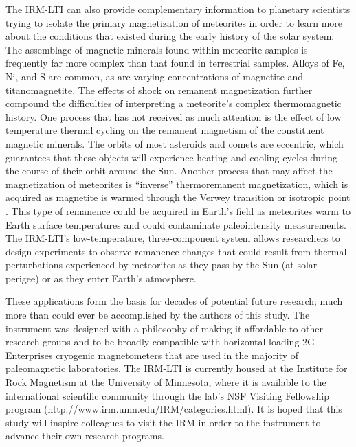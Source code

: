 \documentclass[draft,gc]{AGUTeX}
\begin{document}
\begin{article}
The IRM-LTI can also provide complementary information to planetary scientists trying to isolate the primary magnetization of meteorites in order to learn more about the conditions that existed during the early history of the solar system. The assemblage of magnetic minerals found within meteorite samples is frequently far more complex than that found in terrestrial samples. Alloys of Fe, Ni, and S are common, as are varying concentrations of magnetite and titanomagnetite. The effects of shock on remanent magnetization further compound the difficulties of interpreting a meteorite’s complex thermomagnetic history. One process that has not received as much attention is the effect of low temperature thermal cycling on the remanent magnetism of the constituent magnetic minerals. The orbits of most asteroids and comets are eccentric, which guarantees that these objects will experience heating and cooling cycles during the course of their orbit around the Sun. Another process that may affect the magnetization of meteorites is “inverse” thermoremanent magnetization, which is acquired as magnetite is warmed through the Verwey transition or isotropic point \citep{Dunlop2006a}. This type of remanence could be acquired in Earth's field as meteorites warm to Earth surface temperatures and could contaminate paleointensity measurements. The IRM-LTI's low-temperature, three-component system allows researchers to design experiments to observe remanence changes that could result from thermal perturbations experienced by meteorites as they pass by the Sun (at solar perigee) or as they enter Earth’s atmosphere.

These applications form the basis for decades of potential future research; much more than could ever be accomplished by the authors of this study. The instrument was designed with a philosophy of making it affordable to other research groups and to be broadly compatible with horizontal-loading 2G Enterprises cryogenic magnetometers that are used in the majority of paleomagnetic laboratories. The IRM-LTI is currently housed at the Institute for Rock Magnetism at the University of Minnesota, where it is available to the international scientific community through the lab's NSF Visiting Fellowship program (http://www.irm.umn.edu/IRM/categories.html). It is hoped that this study will inspire colleagues to visit the IRM in order to the instrument to advance their own research programs.    



\end{article}
\end{document}
